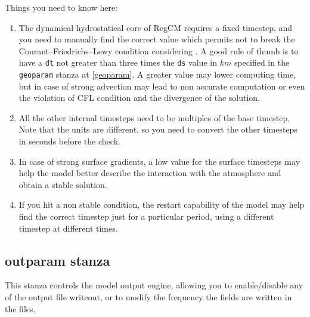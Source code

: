 Things you need to know here:

\begin{enumerate}
\item The dynamical hydrostatical core of RegCM requires a fixed timestep,
and you need to manually find the correct value which permits not to break
the Courant–Friedrichs–Lewy condition considering \cite{CFL}. A good rule
of thumb is to have a \verb=dt= not greater than three times the \verb=ds=
value in $km$ specified in the \verb=geoparam= stanza at \ref{geoparam}.
A greater value may lower computing time, but in case of strong advection
may lead to non accurate computation or even the violation of CFL condition
and the divergence of the solution.
\item All the other internal timesteps need to be multiples of the base timestep.
Note that the units are different, so you need to convert the other timesteps
in seconds before the check.
\item In case of strong surface gradients, a low value for the surface timesteps
may help the model better describe the interaction with the atmosphere and
obtain a stable solution.
\item If you hit a non stable condition, the restart capability of the model
may help find the correct timestep just for a particular period, using a
different timestep at different times.
\end{enumerate}

\subsection{outparam stanza}

This stanza controls the model output engine, allowing you to enable/disable
any of the output file writeout, or to modify the frequency the fields are
written in the files.

